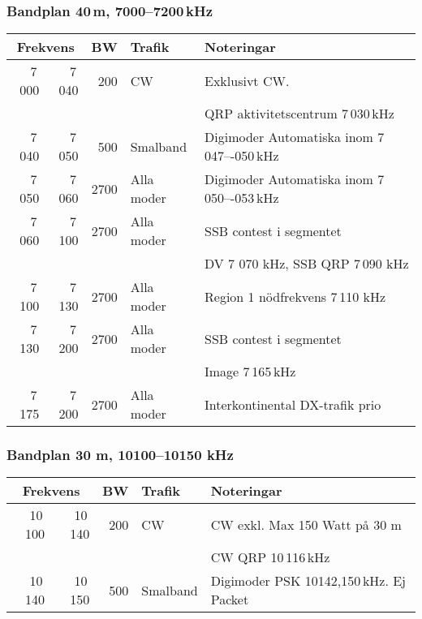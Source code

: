 \begin{landscape}
\subsubsection{Bandplan 40\,m, 7000--7200\,kHz}
\begin{tabular}{rrrll}
\multicolumn{2}{c}{\textbf{Frekvens}} & \textbf{BW} & \textbf{Trafik} & \textbf{Noteringar} \\ \hline
7\,000 & 7\,040 & 200  & CW         & Exklusivt CW.                             \\
      &       &      &            & QRP aktivitetscentrum 7\,030\,kHz           \\ \hline
7\,040 & 7\,050 & 500  & Smalband   & Digimoder Automatiska inom 7\,047–-050\,kHz \\ \hline
7\,050 & 7\,060 & 2700 & Alla moder & Digimoder Automatiska inom 7\,050–-053\,kHz \\ \hline
7\,060 & 7\,100 & 2700 & Alla moder & SSB contest i segmentet                   \\
      &       &      &            & DV 7 070 kHz, SSB QRP 7\,090 kHz           \\ \hline
7\,100 & 7\,130 & 2700 & Alla moder & Region 1 nödfrekvens 7\,110 kHz            \\ \hline
7\,130 & 7\,200 & 2700 & Alla moder & SSB contest i segmentet                   \\
      &       &      &            & Image 7\,165\,kHz                           \\ \hline
7\,175 & 7\,200 & 2700 & Alla moder & Interkontinental DX-trafik prio           \\ \hline
\end{tabular}

\subsubsection{Bandplan 30 m, 10100--10150 kHz}
\begin{tabular}{rrrll}
\multicolumn{2}{c}{\textbf{Frekvens}} & \textbf{BW} & \textbf{Trafik} & \textbf{Noteringar} \\ \hline
10\,100 & 10\,140 & 200 & CW       & CW exkl. Max 150 Watt på 30 m    \\
       &        &     &          & CW QRP 10\,116\,kHz                     \\ \hline
10\,140 & 10\,150 & 500 & Smalband & Digimoder PSK 10142,150\,kHz. Ej Packet \\ \hline
\end{tabular}


\end{landscape}
